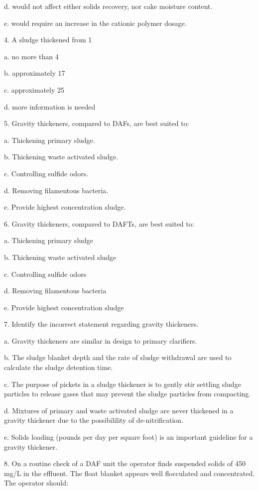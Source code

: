 \documentclass{article}
\begin{document}
d. would not affect either solids recovery, nor cake moisture content. 

e. would require an increase in the cationic polymer dosage. 


4. A sludge thickened from 1%

a. no more than 4%

b. approximately 17%

c. approximately 25%

d. more information is needed 


5. Gravity thickeners, compared to DAFs, are best suited to: 

a. Thickening primary sludge. 

b. Thickening waste activated sludge. 

c. Controlling sulfide odors. 

d. Removing filamentous bacteria. 

e. Provide highest concentration sludge. 


6. Gravity thickeners, compared to DAFTs, are best suited to: 

a. Thickening primary sludge 

b. Thickening waste activated sludge 

c. Controlling sulfide odors 

d. Removing filamentous bacteria 

e. Provide highest concentration sludge 


7. Identify the incorrect statement regarding gravity thickeners. 

a. Gravity thickeners are similar in design to primary clarifiers. 

b. The sludge blanket depth and the rate of sludge withdrawal are used to calculate the sludge detention time. 

c. The purpose of pickets in a sludge thickener is to gently stir settling sludge particles to release gases that may prevent the sludge particles from compacting. 

d. Mixtures of primary and waste activated sludge are never thickened in a gravity thickener due to the possibilility of de-nitrification. 

e. Solids loading (pounds per day per square foot) is an important guideline for a gravity thickener. 


8. On a routine check of a DAF unit the operator finds suspended solids of 450 mg/L in the effluent. The float blanket appears well flocculated and concentrated. The operator should: 
\end{document}
